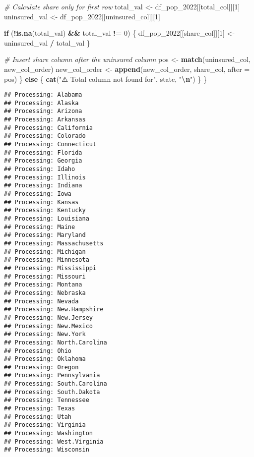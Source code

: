 \documentclass[
]{article}
\newenvironment{Shaded}{\begin{snugshade}}{\end{snugshade}}
\newcommand{\AttributeTok}[1]{\textcolor[rgb]{0.13,0.29,0.53}{#1}}
\newcommand{\CommentTok}[1]{\textcolor[rgb]{0.56,0.35,0.01}{\textit{#1}}}
\newcommand{\ControlFlowTok}[1]{\textcolor[rgb]{0.13,0.29,0.53}{\textbf{#1}}}
\newcommand{\DecValTok}[1]{\textcolor[rgb]{0.00,0.00,0.81}{#1}}
\newcommand{\FunctionTok}[1]{\textcolor[rgb]{0.13,0.29,0.53}{\textbf{#1}}}
\newcommand{\NormalTok}[1]{#1}
\newcommand{\OtherTok}[1]{\textcolor[rgb]{0.56,0.35,0.01}{#1}}
\newcommand{\SpecialCharTok}[1]{\textcolor[rgb]{0.81,0.36,0.00}{\textbf{#1}}}
\newcommand{\StringTok}[1]{\textcolor[rgb]{0.31,0.60,0.02}{#1}}
\begin{document}
\begin{Shaded}
\begin{Highlighting}[]
    \CommentTok{\# Calculate share only for first row}
\NormalTok{    total\_val }\OtherTok{\textless{}{-}}\NormalTok{ df\_pop\_2022[[total\_col]][}\DecValTok{1}\NormalTok{]}
\NormalTok{    uninsured\_val }\OtherTok{\textless{}{-}}\NormalTok{ df\_pop\_2022[[uninsured\_col]][}\DecValTok{1}\NormalTok{]}
    
    \ControlFlowTok{if}\NormalTok{ (}\SpecialCharTok{!}\FunctionTok{is.na}\NormalTok{(total\_val) }\SpecialCharTok{\&\&}\NormalTok{ total\_val }\SpecialCharTok{!=} \DecValTok{0}\NormalTok{) \{}
\NormalTok{      df\_pop\_2022[[share\_col]][}\DecValTok{1}\NormalTok{] }\OtherTok{\textless{}{-}}\NormalTok{ uninsured\_val }\SpecialCharTok{/}\NormalTok{ total\_val}
\NormalTok{    \}}
    
    \CommentTok{\# Insert share column after the uninsured column}
\NormalTok{    pos }\OtherTok{\textless{}{-}} \FunctionTok{match}\NormalTok{(uninsured\_col, new\_col\_order)}
\NormalTok{    new\_col\_order }\OtherTok{\textless{}{-}} \FunctionTok{append}\NormalTok{(new\_col\_order, share\_col, }\AttributeTok{after =}\NormalTok{ pos)}
\NormalTok{  \} }\ControlFlowTok{else}\NormalTok{ \{}
    \FunctionTok{cat}\NormalTok{(}\StringTok{"⚠️ Total column not found for"}\NormalTok{, state, }\StringTok{"}\SpecialCharTok{\textbackslash{}n}\StringTok{"}\NormalTok{)}
\NormalTok{  \}}
\NormalTok{\}}
\end{Highlighting}
\end{Shaded}

\begin{verbatim}
## Processing: Alabama 
## Processing: Alaska 
## Processing: Arizona 
## Processing: Arkansas 
## Processing: California 
## Processing: Colorado 
## Processing: Connecticut 
## Processing: Florida 
## Processing: Georgia 
## Processing: Idaho 
## Processing: Illinois 
## Processing: Indiana 
## Processing: Iowa 
## Processing: Kansas 
## Processing: Kentucky 
## Processing: Louisiana 
## Processing: Maine 
## Processing: Maryland 
## Processing: Massachusetts 
## Processing: Michigan 
## Processing: Minnesota 
## Processing: Mississippi 
## Processing: Missouri 
## Processing: Montana 
## Processing: Nebraska 
## Processing: Nevada 
## Processing: New.Hampshire 
## Processing: New.Jersey 
## Processing: New.Mexico 
## Processing: New.York 
## Processing: North.Carolina 
## Processing: Ohio 
## Processing: Oklahoma 
## Processing: Oregon 
## Processing: Pennsylvania 
## Processing: South.Carolina 
## Processing: South.Dakota 
## Processing: Tennessee 
## Processing: Texas 
## Processing: Utah 
## Processing: Virginia 
## Processing: Washington 
## Processing: West.Virginia 
## Processing: Wisconsin
\end{verbatim}
\end{document}

